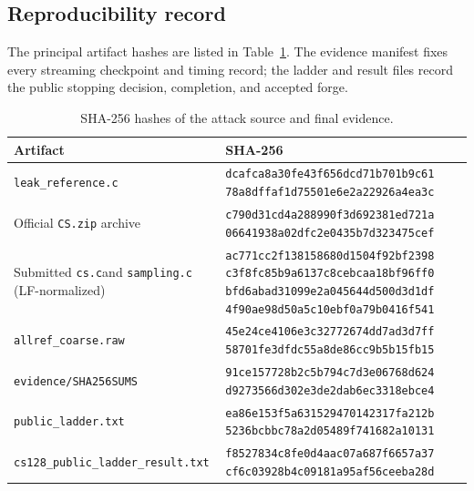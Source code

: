 \documentclass[11pt]{article}
\begin{document}
\subsection{Reproducibility record}

The principal artifact hashes are listed in Table~\ref{tab:hashes}.  The evidence manifest
fixes every streaming checkpoint and timing record; the ladder and result files record the
public stopping decision, completion, and accepted forge.

\begin{table}[ht]
\centering
\caption{SHA-256 hashes of the attack source and final evidence.}
\label{tab:hashes}
\small
\begin{tabular}{@{}p{}p{}@{}}
\toprule
Artifact & SHA-256 \\
\midrule
\texttt{leak\_reference.c} &
\texttt{dcafca8a30fe43f656dcd71b701b9c61}\newline
\texttt{78a8dffaf1d75501e6e2a22926a4ea3c} \\
Official \texttt{CS.zip} archive &
\texttt{c790d31cd4a288990f3d692381ed721a}\newline
\texttt{06641938a02dfc2e0435b7d323475cef} \\
Submitted \texttt{cs.c}\newline and \texttt{sampling.c}\newline
(LF-normalized) &
\texttt{ac771cc2f138158680d1504f92bf2398}\newline
\texttt{c3f8fc85b9a6137c8cebcaa18bf96ff0}\newline
\texttt{bfd6abad31099e2a045644d500d3d1df}\newline
\texttt{4f90ae98d50a5c10ebf0a79b0416f541} \\
\texttt{allref\_coarse.raw} &
\texttt{45e24ce4106e3c32772674dd7ad3d7ff}\newline
\texttt{58701fe3dfdc55a8de86cc9b5b15fb15} \\
\texttt{evidence/SHA256SUMS} &
\texttt{91ce157728b2c5b794c7d3e06768d624}\newline
\texttt{d9273566d302e3de2dab6ec3318ebce4} \\
\texttt{public\_ladder.txt} &
\texttt{ea86e153f5a631529470142317fa212b}\newline
\texttt{5236bcbbc78a2d05489f741682a10131} \\
\texttt{cs128\_public\_ladder\_}\newline\texttt{result.txt} &
\texttt{f8527834c8fe0d4aac07a687f6657a37}\newline
\texttt{cf6c03928b4c09181a95af56ceeba28d} \\
\bottomrule
\end{tabular}
\end{table}
\end{document}
